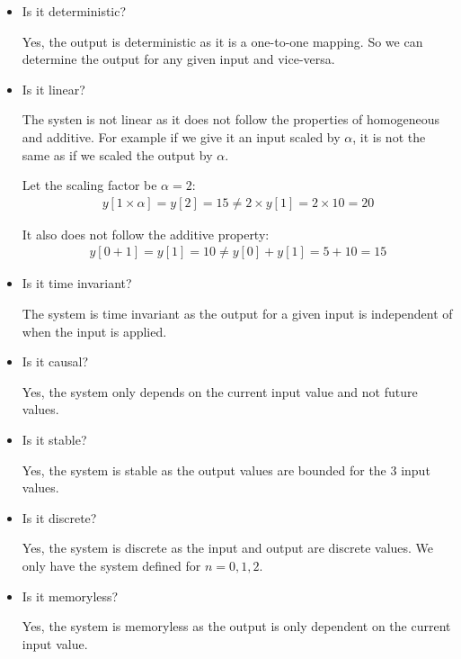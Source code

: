 \documentclass{article}
\begin{document}
\begin{itemize}
    \item Is it deterministic? 
    
    Yes, the output is deterministic as it is a one-to-one mapping. So we can determine the output for any given input and vice-versa.

    \item Is it linear?
    
    The systen is not linear as it does not follow the properties of homogeneous and additive. For example if we give it an input scaled by $\alpha$, it is not the same as if we scaled the output by $\alpha$.

    Let the scaling factor be $\alpha = 2$:
    \begin{align*}
        y[1 \times \alpha] = y[2] = 15 \neq 2 \times y[1] = 2 \times 10 = 20
    \end{align*}

    It also does not follow the additive property:
    \begin{align*}
        y[0 + 1] = y[1] = 10 \neq y[0] + y[1] = 5 + 10 = 15
    \end{align*}

    \item Is it time invariant?
    
    The system is time invariant as the output for a given input is independent of when the input is applied. 

    \item Is it causal?

    Yes, the system only depends on the current input value and not future values.

    \item Is it stable?

    Yes, the system is stable as the output values are bounded for the 3 input values.

    \item Is it discrete?

    Yes, the system is discrete as the input and output are discrete values. We only have the system defined for $n = 0, 1, 2$.

    \item Is it memoryless?

    Yes, the system is memoryless as the output is only dependent on the current input value.
\end{itemize}

\end{document}
